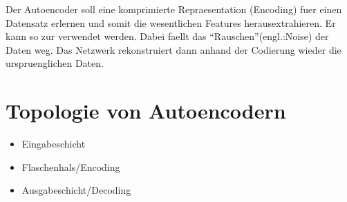 Der Autoencoder soll eine komprimierte Repraesentation (Encoding) fuer einen
Datensatz erlernen und somit die wesentlichen Features herausextrahieren. Er
kann so zur  verwendet werden. Dabei faellt
das ``Rauschen''(engl.:Noise) der Daten weg. Das Netzwerk rekonstruiert dann
anhand der Codierung wieder die urspruenglichen Daten.



\section{Topologie von Autoencodern}

\begin{itemize}
\item{Eingabeschicht}
\item{Flaschenhals/Encoding}
\item{Ausgabeschicht/Decoding}
\end{itemize}

